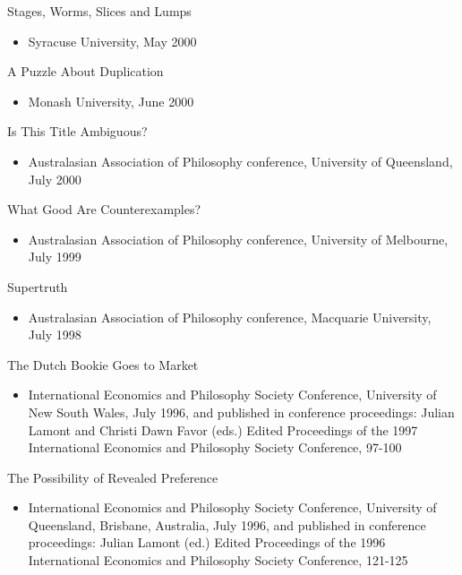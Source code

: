 \documentclass[
  10pt,
  letterpaper,
  DIV=11,
  numbers=noendperiod,
  twoside]{scrartcl}
\providecommand{\tightlist}{%
  \setlength{\itemsep}{0pt}\setlength{\parskip}{0pt}}\usepackage{longtable,booktabs,array}
\begin{document}
Stages, Worms, Slices and Lumps

\begin{itemize}
\tightlist
\item
  Syracuse University, May 2000
\end{itemize}

A Puzzle About Duplication

\begin{itemize}
\tightlist
\item
  Monash University, June 2000
\end{itemize}

Is This Title Ambiguous?

\begin{itemize}
\tightlist
\item
  Australasian Association of Philosophy conference, University of
  Queensland, July 2000
\end{itemize}

What Good Are Counterexamples?

\begin{itemize}
\tightlist
\item
  Australasian Association of Philosophy conference, University of
  Melbourne, July 1999
\end{itemize}

Supertruth

\begin{itemize}
\tightlist
\item
  Australasian Association of Philosophy conference, Macquarie
  University, July 1998
\end{itemize}

The Dutch Bookie Goes to Market

\begin{itemize}
\tightlist
\item
  International Economics and Philosophy Society Conference, University
  of New South Wales, July 1996, and published in conference
  proceedings: Julian Lamont and Christi Dawn Favor (eds.) Edited
  Proceedings of the 1997 International Economics and Philosophy Society
  Conference, 97-100
\end{itemize}

The Possibility of Revealed Preference

\begin{itemize}
\tightlist
\item
  International Economics and Philosophy Society Conference, University
  of Queensland, Brisbane, Australia, July 1996, and published in
  conference proceedings: Julian Lamont (ed.) Edited Proceedings of the
  1996 International Economics and Philosophy Society Conference,
  121-125
\end{itemize}
\end{document}
